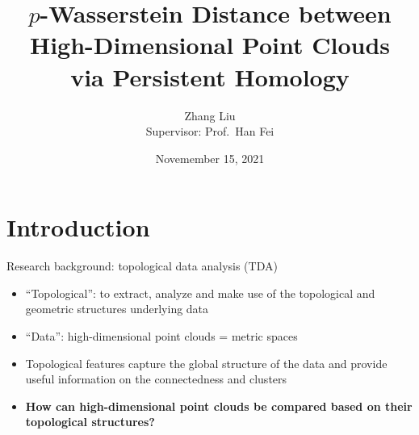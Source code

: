 \documentclass[xcolor={dvipsnames,svgnames}]{beamer}
\title{$p$-Wasserstein Distance between High-Dimensional Point Clouds \\ via Persistent Homology}
\author{Zhang Liu\\ Supervisor: Prof.~Han Fei}
\date{Novemember 15, 2021}
\begin{document}
\section{Introduction}
\begin{frame}
\titlepage
\end{frame}
\begin{frame}{Research background: topological data analysis (TDA)}
\begin{itemize}
    \item ``Topological'': to extract, analyze and make use of the topological and geometric structures underlying data
    \item ``Data'': high-dimensional point clouds = metric spaces
    \item Topological features capture the global structure of the data and provide useful information on the connectedness and clusters
    \item \textbf{How can high-dimensional point clouds be compared based on their topological structures?}
\end{itemize}
\end{frame}
\end{document}
